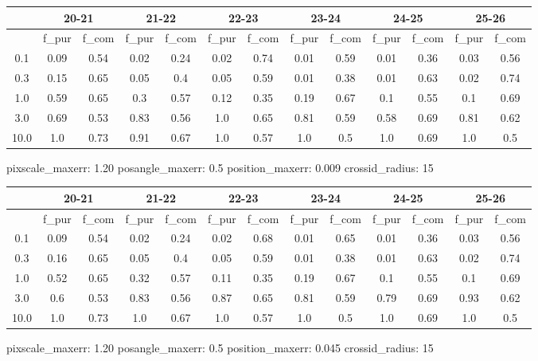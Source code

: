 \documentclass{article}
\begin{document}
\begin{figure}[H]
\centering
\begin{tabular}{|c|c|c|c|c|c|c|c|c|c|c|c|c|}
\hline
\multicolumn{1}{|c|}{} & \multicolumn{2}{|c|}{20-21} & \multicolumn{2}{|c|}{21-22} & \multicolumn{2}{|c|}{22-23} & \multicolumn{2}{|c|}{23-24} & \multicolumn{2}{|c|}{24-25} & \multicolumn{2}{|c|}{25-26}\\
\hline \hline
 & f\_pur & f\_com & f\_pur & f\_com & f\_pur & f\_com & f\_pur & f\_com & f\_pur & f\_com & f\_pur & f\_com \\
\hline
0.1 & 0.09 & 0.54 & 0.02 & 0.24 & 0.02 & 0.74 & 0.01 & 0.59 & 0.01 & 0.36 & 0.03 & 0.56\\
\hline
0.3 & 0.15 & 0.65 & 0.05 & 0.4 & 0.05 & 0.59 & 0.01 & 0.38 & 0.01 & 0.63 & 0.02 & 0.74\\
\hline
1.0 & 0.59 & 0.65 & 0.3 & 0.57 & 0.12 & 0.35 & 0.19 & 0.67 & 0.1 & 0.55 & 0.1 & 0.69\\
\hline
3.0 & 0.69 & 0.53 & 0.83 & 0.56 & 1.0 & 0.65 & 0.81 & 0.59 & 0.58 & 0.69 & 0.81 & 0.62\\
\hline
10.0 & 1.0 & 0.73 & 0.91 & 0.67 & 1.0 & 0.57 & 1.0 & 0.5 & 1.0 & 0.69 & 1.0 & 0.5\\
\hline
\end{tabular}
\caption{pixscale\_maxerr: 1.20 posangle\_maxerr: 0.5 position\_maxerr: 0.009 crossid\_radius: 15}
\end{figure}

\begin{figure}[H]
\centering
\begin{tabular}{|c|c|c|c|c|c|c|c|c|c|c|c|c|}
\hline
\multicolumn{1}{|c|}{} & \multicolumn{2}{|c|}{20-21} & \multicolumn{2}{|c|}{21-22} & \multicolumn{2}{|c|}{22-23} & \multicolumn{2}{|c|}{23-24} & \multicolumn{2}{|c|}{24-25} & \multicolumn{2}{|c|}{25-26}\\
\hline \hline
 & f\_pur & f\_com & f\_pur & f\_com & f\_pur & f\_com & f\_pur & f\_com & f\_pur & f\_com & f\_pur & f\_com \\
\hline
0.1 & 0.09 & 0.54 & 0.02 & 0.24 & 0.02 & 0.68 & 0.01 & 0.65 & 0.01 & 0.36 & 0.03 & 0.56\\
\hline
0.3 & 0.16 & 0.65 & 0.05 & 0.4 & 0.05 & 0.59 & 0.01 & 0.38 & 0.01 & 0.63 & 0.02 & 0.74\\
\hline
1.0 & 0.52 & 0.65 & 0.32 & 0.57 & 0.11 & 0.35 & 0.19 & 0.67 & 0.1 & 0.55 & 0.1 & 0.69\\
\hline
3.0 & 0.6 & 0.53 & 0.83 & 0.56 & 0.87 & 0.65 & 0.81 & 0.59 & 0.79 & 0.69 & 0.93 & 0.62\\
\hline
10.0 & 1.0 & 0.73 & 1.0 & 0.67 & 1.0 & 0.57 & 1.0 & 0.5 & 1.0 & 0.69 & 1.0 & 0.5\\
\hline
\end{tabular}
\caption{pixscale\_maxerr: 1.20 posangle\_maxerr: 0.5 position\_maxerr: 0.045 crossid\_radius: 15}
\end{figure}
\end{document}
